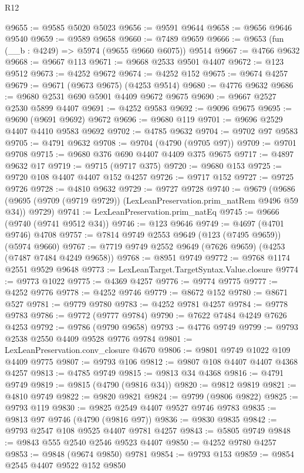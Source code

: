 \begin{lexlean}{R12}
\begin{coremodule}
@9655 := @9585 @5020 @5023
@9656 := @9591 @9644
@9658 := @9656 @9646 @9540
@9659 := @9589 @9658
@9660 := @7489 @9659
@9666 := @9653 (fun (__b : @4249) => @5974 (@9655 @9660 @6075)) @9514
@9667 := @4766 @9632
@9668 := @9667 @113
@9671 := @9668 @2533 @9501 @4407
@9672 := @123 @9512
@9673 := @4252 @9672
@9674 := @4252 @152
@9675 := @9674 @4257
@9679 := @9671 (@9673 @9675) (@4253 @9514)
@9680 := @4776 @9632
@9686 := @9680 @2531 @690 @5901 @4409 @9672 @9675
@9690 := @9667 @2527 @2530 @5899 @4407
@9691 := @4252 @9583
@9692 := @9096 @9675
@9695 := @9690 (@9691 @9692) @9672
@9696 := @9680 @119
@9701 := @9696 @2529 @4407 @4410 @9583 @9692
@9702 := @4785 @9632
@9704 := @9702 @97 @9583
@9705 := @4791 @9632
@9708 := @9704 (@4790 (@9705 @97))
@9709 := @9701 @9708
@9715 := @9680 @376 @690 @4407 @4409 @375 @9675
@9717 := @4897 @9632 @17
@9719 := @9715 (@9717 @375)
@9720 := @9680 @153
@9725 := @9720 @108 @4407 @4407 @152 @4257
@9726 := @9717 @152
@9727 := @9725 @9726
@9728 := @4810 @9632
@9729 := @9727 @9728
@9740 := @9679
    (@9686 (@9695 (@9709 (@9719 @9729)) (LexLeanPreservation.prim_natRem @9496 @59 @34)) @9729)
@9741 := LexLeanPreservation.prim_natEq
@9745 := @9666 (@9740 (@9741 @9512 @34))
@9746 := @123 @9646
@9749 := @4697 (@4701 @9746) @4708
@9757 := @7814 @9749 @2553 @9649 (@123 (@7495 @9659)) (@5974 @9660)
@9767 := @7719 @9749 @2552 @9649 (@7626 @9659) (@4253 (@7487 @7484 @4249 @9658))
@9768 := @8951 @9749
@9772 := @9768 @1174 @2551 @9529 @9648
@9773 := LexLeanTarget.TargetSyntax.Value.closure
@9774 := @9773 @1022
@9775 := @4369 @4257
@9776 := @9774 @9775
@9777 := @4252 @9776
@9778 := @4252 @9746
@9779 := @8672 @152
@9780 := @8671 @527
@9781 := @9779 @9780
@9783 := @4252 @9781 @4257
@9784 := @9778 @9783
@9786 := @9772 (@9777 @9784)
@9790 := @7622 @7484 @4249 @7626 @4253
@9792 := @9786 (@9790 @9658)
@9793 := @4776 @9749
@9799 := @9793 @2538 @2550 @4409 @9528 @9776 @9784
@9801 := LexLeanPreservation.conv_closure @4670
@9806 := @9801 @9749 @1022 @109 @4409 @9775
@9807 := @9793 @106
@9812 := @9807 @108 @4407 @4407 @4368 @4257
@9813 := @4785 @9749
@9815 := @9813 @34 @4368
@9816 := @4791 @9749
@9819 := @9815 (@4790 (@9816 @34))
@9820 := @9812 @9819
@9821 := @4810 @9749
@9822 := @9820 @9821
@9824 := @9799 (@9806 @9822)
@9825 := @9793 @119
@9830 := @9825 @2549 @4407 @9527 @9746 @9783
@9835 := @9813 @97 @9746 (@4790 (@9816 @97))
@9836 := @9830 @9835
@9842 := @9793 @2547 @108 @9525 @4407 @9781 @4257
@9843 := @5805 @9749
@9848 := @9843 @555 @2540 @2546 @9523 @4407
@9850 := @4252 @9780 @4257
@9853 := @9848 (@9674 @9850) @9781
@9854 := @9793 @153
@9859 := @9854 @2545 @4407 @9522 @152 @9850

\end{coremodule}
\end{lexlean}
